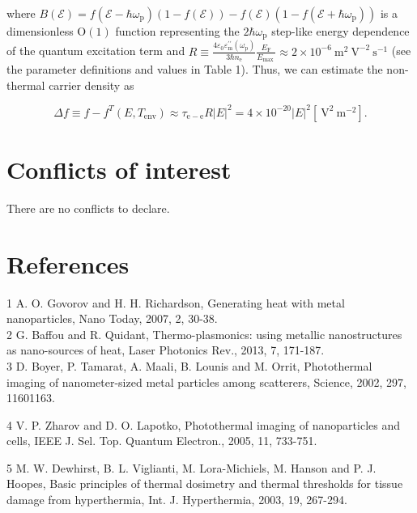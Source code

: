 \documentclass[10pt]{article}
\begin{document}
where $B(\mathcal{E})=f\left(\mathcal{E}-\hbar \omega_{\mathrm{p}}\right)(1-f(\mathcal{E}))-f(\mathcal{E})\left(1-f\left(\mathcal{E}+\hbar \omega_{\mathrm{p}}\right)\right)$ is a dimensionless $\mathrm{O}(1)$ function representing the $2 \hbar \omega_{\mathrm{p}}$ step-like energy dependence of the quantum excitation term and $R \equiv \frac{4 \varepsilon_{0} \varepsilon_{\mathrm{m}}^{\prime \prime}\left(\omega_{\mathrm{p}}\right)}{3 \hbar n_{\mathrm{e}}} \frac{E_{\mathrm{F}}}{E_{\text {max }}} \approx 2 \times 10^{-6} \mathrm{~m}^{2} \mathrm{~V}^{-2} \mathrm{~s}^{-1}$ (see the parameter definitions and values in Table 1). Thus, we can estimate the non-thermal carrier density as


\begin{equation*}
\Delta f \equiv f-f^{T}\left(E, T_{\mathrm{env}}\right) \approx \tau_{\mathrm{e}-\mathrm{e}} R|E|^{2}=4 \times 10^{-20}|E|^{2}\left[\mathrm{~V}^{2} \mathrm{~m}^{-2}\right] . \tag{A8}
\end{equation*}


\section*{Conflicts of interest}
There are no conflicts to declare.

\section*{References}
1 A. O. Govorov and H. H. Richardson, Generating heat with metal nanoparticles, Nano Today, 2007, 2, 30-38.\\
2 G. Baffou and R. Quidant, Thermo-plasmonics: using metallic nanostructures as nano-sources of heat, Laser Photonics Rev., 2013, 7, 171-187.\\
3 D. Boyer, P. Tamarat, A. Maali, B. Lounis and M. Orrit, Photothermal imaging of nanometer-sized metal particles among scatterers, Science, 2002, 297, 11601163.

4 V. P. Zharov and D. O. Lapotko, Photothermal imaging of nanoparticles and cells, IEEE J. Sel. Top. Quantum Electron., 2005, 11, 733-751.

5 M. W. Dewhirst, B. L. Viglianti, M. Lora-Michiels, M. Hanson and P. J. Hoopes, Basic principles of thermal dosimetry and thermal thresholds for tissue damage from hyperthermia, Int. J. Hyperthermia, 2003, 19, 267-294.
\end{document}

